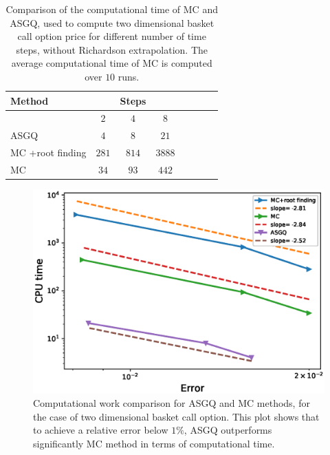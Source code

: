 \begin{table}[h!]
	\centering
	\begin{tabular}{l*{6}{c}r}
		\toprule[1.5pt]
	Method & & Steps  & &     \\
	\hline
	         & $2$ & $4$ & $8$    \\
		\hline
		ASGQ & $4$  & $8$ & $21$     \\
			MC +root finding  & $281$&  $814$&  $3888$   \\
				MC  &   $34$& $93$ &   $ 442$ \\
		\bottomrule[1.25pt]
	\end{tabular}
	\caption{Comparison of the computational time of  MC and ASGQ, used to compute two dimensional basket call option price  for different number of time steps, without Richardson extrapolation. The average computational time of MC is computed over $10$ runs.}
	\label{Comparsion of the computational time of  MC and MISC, used to compute two dim basket Call option price  for different number of time steps, without Richardson extrapolation}
\end{table}


\FloatBarrier
	\begin{figure}[h!]
\centering
\includegraphics[width=0.4\linewidth]{./figures/basket_call_2d_time_stepping/complexity_rates/error_vs_time}

\caption{Computational work comparison for ASGQ and MC methods, for the case of two dimensional basket call option. This plot shows that to achieve a relative error below $1\%$, ASGQ outperforms significantly MC method in terms of computational time.}
\label{fig:Complexity plot for MC and MISC , two dim basket call non rich}
\end{figure}


\FloatBarrier

